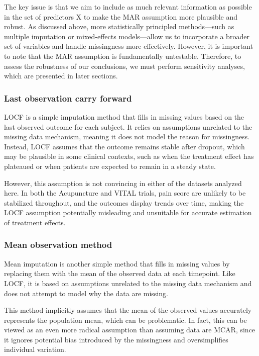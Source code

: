 \documentclass{article}
\begin{document}
The key issue is that we aim to include as much relevant information as
possible in the set of predictors X to make the MAR assumption more
plausible and robust. As discussed above, more statistically principled
methods---such as multiple imputation or mixed-effects models---allow us
to incorporate a broader set of variables and handle missingness more
effectively. However, it is important to note that the MAR assumption is
fundamentally untestable. Therefore, to assess the robustness of our
conclusions, we must perform sensitivity analyses, which are presented
in later sections.

\subsubsection{Last observation carry
forward}\label{last-observation-carry-forward}

LOCF is a simple imputation method that fills in missing values based on
the last observed outcome for each subject. It relies on assumptions
unrelated to the missing data mechanism, meaning it does not model the
reason for missingness. Instead, LOCF assumes that the outcome remains
stable after dropout, which may be plausible in some clinical contexts,
such as when the treatment effect has plateaued or when patients are
expected to remain in a steady state.

However, this assumption is not convincing in either of the datasets
analyzed here. In both the Acupuncture and VITAL trials, pain score are
unlikely to be stabilized throughout, and the outcomes display trends
over time, making the LOCF assumption potentially misleading and
unsuitable for accurate estimation of treatment effects.

\subsubsection{Mean observation method}\label{mean-observation-method}

Mean imputation is another simple method that fills in missing values by
replacing them with the mean of the observed data at each timepoint.
Like LOCF, it is based on assumptions unrelated to the missing data
mechanism and does not attempt to model why the data are missing.

This method implicitly assumes that the mean of the observed values
accurately represents the population mean, which can be problematic. In
fact, this can be viewed as an even more radical assumption than
assuming data are MCAR, since it ignores potential bias introduced by
the missingness and oversimplifies individual variation.
\end{document}
